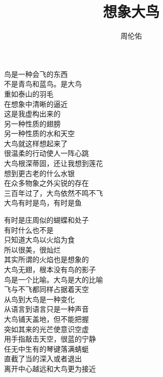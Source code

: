 \documentclass{article}
\title{想象大鸟}
\author{周伦佑}
\date{}
\begin{document}

\maketitle

\setlength\parindent{0pt}


\Large

﻿鸟是一种会飞的东西\\
不是青鸟和蓝鸟。是大鸟\\
重如泰山的羽毛\\
在想象中清晰的逼近\\
这是我虚构出来的\\
另一种性质的翅膀\\
另一种性质的水和天空 \\ 


大鸟就这样想起来了\\
很温柔的行动使人一阵心跳\\
大鸟根深蒂固，还让我想到莲花\\
想到更古老的什么水银\\
在众多物象之外尖锐的存在\\
三百年过了，大鸟依然不鸣不飞 \\ 


大鸟有时是鸟，有时是鱼\\
\newpage

有时是庄周似的蝴蝶和处子\\
有时什么也不是\\
只知道大鸟以火焰为食\\
所以很美，很灿烂\\
其实所谓的火焰也是想象的\\
大鸟无翅，根本没有鸟的影子 \\ 


鸟是一个比喻。大鸟是大的比喻\\
飞与不飞都同样占据着天空 \\ 


从鸟到大鸟是一种变化\\
从语言到语言只是一种声音\\
大鸟铺天盖地，但不能把握\\
突如其来的光芒使意识空虚\\
用手指敲击天空，很蓝的宁静\\
任无中生有的琴键落满蜻蜓\\
直截了当的深入或者退出\\
离开中心越远和大鸟更为接近 \\ 
\end{document}
